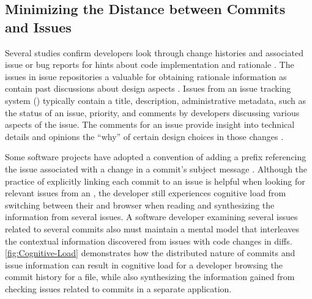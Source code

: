 \subsection{Minimizing the Distance between Commits and Issues}
\label{subsec:Minimize-Commit-Issue-Distance}

Several studies confirm developers look through change histories and associated issue 
or bug reports for hints about code implementation and rationale \cite{ko_information_2007,robillard_turnover-induced_2021, rastkar_why_2013}.
The issues in issue repositories  a valuable for obtaining rationale information 
as  contain past discussions about design aspects \cite{brunet_design_2014,hassan_road_2008}.
Issues from an issue tracking system () typically contain a title, 
description, administrative metadata, such as the status of an issue, priority, 
and comments by developers discussing various aspects of the issue.
The comments for an issue provide insight into technical details 
and opinions  the ``why'' of certain design choices in those changes \cite{ortu_jira_2015}.

Some software projects have adopted a convention of adding a prefix referencing 
the issue associated with a change in a commit's subject message \cite{rastkar_why_2013,moreno_arena_2017}.
Although the practice of explicitly linking each commit to an issue is helpful when looking for relevant issues from an , the developer still experiences cognitive load from switching between their  and browser when reading and synthesizing the information from several issues.
A software developer examining several issues related to several commits also must maintain a mental model that interleaves the contextual information discovered from issues with code changes in diffs.
\autoref{fig:Cognitive-Load} demonstrates how the distributed nature of commits and issue information can result in cognitive load for a developer browsing the commit history for a file, while also synthesizing the information gained from checking issues related to commits in a separate application.

